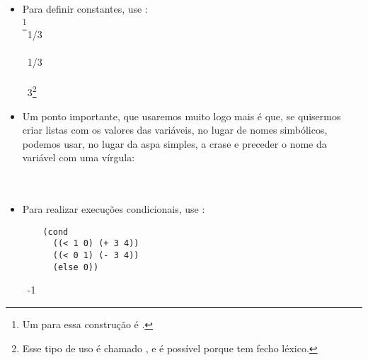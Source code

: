 \documentclass{article}
\begin{document}
\begin{itemize}
{    ter fórmulas crescendo linearmente na horizontal (note que o
    ``chapéu'' faz com que a fórmula cresça para cima), então decidiu
    mover o chapéu para o lado, obtendo .
    Mas o chapéu flutuando parece engraçado, então Church o trocou
    pelo  o símbolo não usado mais próximo que tinha, um $\Lambda$, como em
    . Mas
    $\Lambda$ tem uma grafia muito parecida com outra letra comum, o que foi
    percebido como um incoveniente, então ele acabou eventualmente
    trocando para $\lambda$ em sua teoria, que acabou se chamando
     \cite{norvig}.}:\\
   \seta\ 1/3n

\item Para definir constantes, use :\\
  \footnote{Um
     para essa construção é
    .}\\
   \seta\ 1/3\\
  \\
   \seta\ 1/3\\
  \\
   \seta\ 3\footnote{Esse tipo de uso é chamado
    , e é possível porque  tem
    fecho léxico.}

\item  Um ponto importante, que usaremos muito logo mais é que, se
  quisermos criar listas com os valores das variáveis, no lugar de
  nomes simbólicos, podemos usar, no lugar da aspa simples, a crase e
  preceder o nome da variável com uma vírgula:\\
  \\
   \seta\ 

\item Para realizar execuções condicionais, use :\\
  \begin{lstlisting}
    (cond
      ((< 1 0) (+ 3 4))
      ((< 0 1) (- 3 4))
      (else 0))
  \end{lstlisting}
  \hspace{1cm} \seta\ -1\\
  

\end{itemize}
\end{document}
